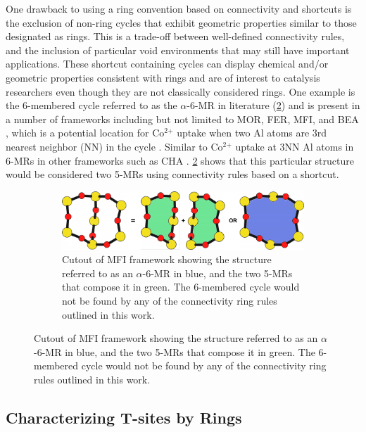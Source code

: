 \documentclass[preprint,numrefs,noinfo,sort&compress]{elsarticle}
\begin{document}
One drawback to using a ring convention based on connectivity and shortcuts is the exclusion of non-ring cycles that exhibit geometric properties similar to those designated as rings. This is a trade-off between well-defined connectivity rules, and the inclusion of particular void environments that may still have important applications. These shortcut containing cycles can display chemical and/or geometric properties consistent with rings and are of interest to catalysis researchers even though they are not classically considered rings. One example is the 6-membered cycle referred to as the \(\alpha\)-6-MR in literature (\cref{fig:mfi-6}) and is present in a number of frameworks including but not limited to MOR, FER, MFI, and BEA \cite{dedecek-siting-2012,bernauer-proton-2016}, which is a potential location for Co\(^{\text{2+}}\) uptake when two Al atoms are 3rd nearest neighbor (NN) in the cycle  \cite{bernauer-proton-2016,nimlos-experimental-2020}. Similar to Co\(^{\text{2+}}\) uptake at 3NN Al atoms in 6-MRs in other frameworks such as CHA \cite{di-iorio-cooperative-2020}. \cref{fig:mfi-6} shows that this particular structure would be considered two 5-MRs using connectivity rules based on a shortcut. 

\begin{figure}
\begin{figure}[H]
\centering
\includegraphics[width=\textwidth]{figures/chapter-3/MFI-6MC.pdf}
\caption{Cutout of MFI framework showing the structure referred to as an \(\alpha\)-6-MR in blue, and the two 5-MRs that compose it in green. The 6-membered cycle would not be found by any of the connectivity ring rules outlined in this work. \label{fig:mfi-6}}
\end{figure}
\end{figure}

\subsection{Characterizing T-sites by Rings}
\label{sec:org98f8218}
\end{document}
